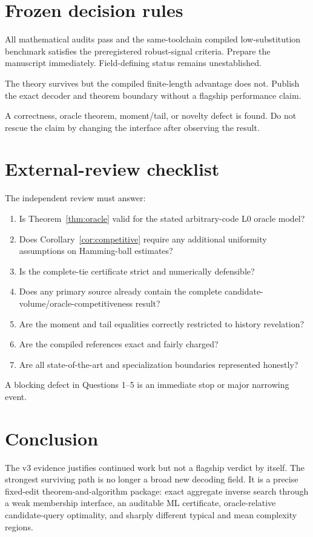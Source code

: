 \documentclass[11pt]{article}
\theoremstyle{definition}
\theoremstyle{remark}
\begin{document}
\section{Frozen decision rules}
\begin{description}[leftmargin=3.2em,style=nextline]
\item[PROCEED\_TO\_FLAGSHIP\_TIT\_MANUSCRIPT\_AND\_EXTERNAL\_REVIEW]
All mathematical audits pass and the same-toolchain compiled low-substitution benchmark satisfies the preregistered robust-signal criteria.  Prepare the manuscript immediately.  Field-defining status remains unestablished.
\item[NARROW\_TO\_STRONG\_FIXED\_EDIT\_THEORY\_AND\_ALGORITHM\_PAPER]
The theory survives but the compiled finite-length advantage does not.  Publish the exact decoder and theorem boundary without a flagship performance claim.
\item[STOP\_FIBER\_FLAGSHIP\_TRACK]
A correctness, oracle theorem, moment/tail, or novelty defect is found.  Do not rescue the claim by changing the interface after observing the result.
\end{description}

\section{External-review checklist}
The independent review must answer:
\begin{enumerate}[leftmargin=2em]
\item Is Theorem~\ref{thm:oracle} valid for the stated arbitrary-code L0 oracle model?
\item Does Corollary~\ref{cor:competitive} require any additional uniformity assumptions on Hamming-ball estimates?
\item Is the complete-tie certificate strict and numerically defensible?
\item Does any primary source already contain the complete candidate-volume/oracle-competitiveness result?
\item Are the moment and tail equalities correctly restricted to history revelation?
\item Are the compiled references exact and fairly charged?
\item Are all state-of-the-art and specialization boundaries represented honestly?
\end{enumerate}
A blocking defect in Questions 1--5 is an immediate stop or major narrowing event.

\section{Conclusion}
The v3 evidence justifies continued work but not a flagship verdict by itself.  The strongest surviving path is no longer a broad new decoding field.  It is a precise fixed-edit theorem-and-algorithm package: exact aggregate inverse search through a weak membership interface, an auditable ML certificate, oracle-relative candidate-query optimality, and sharply different typical and mean complexity regions.
\end{document}
